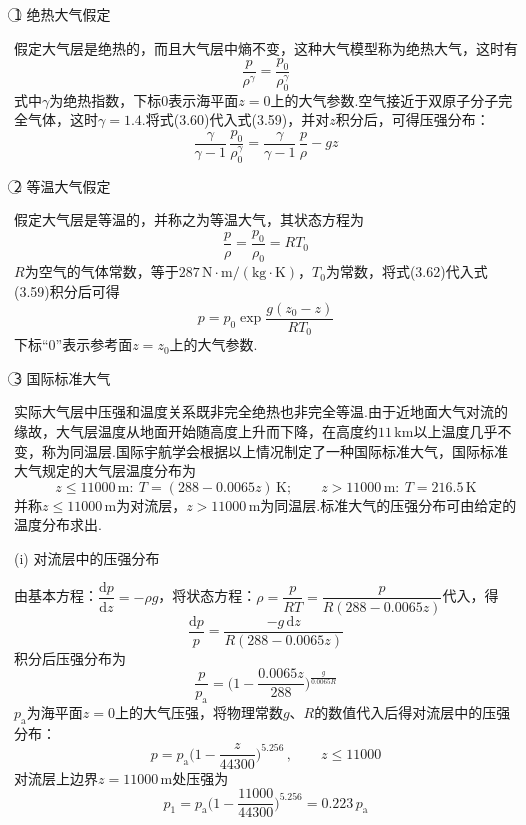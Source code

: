 \textcircled{1} 绝热大气假定

假定大气层是绝热的，而且大气层中熵不变，这种大气模型称为绝热大气，这时有
\begin{equation*}
\frac{p}{\rho^{\gamma}}=\frac{p_0}{\rho_0^{\gamma}}
\tag{3.60}
\end{equation*}
式中$\gamma$为绝热指数，下标0表示海平面$z=0$上的大气参数.空气接近于双原子分子完全气体，这时$\gamma=1.4$.将式(3.60)代入式(3.59)，并对$z$积分后，可得压强分布：
\begin{equation*}
\frac{\gamma}{\gamma-1}\,\frac{p_0}{\rho_0^{\gamma}}=\frac{\gamma}{\gamma-1}\,\frac{p}{\rho}-gz
\tag{3.61}
\end{equation*}

\textcircled{2} 等温大气假定

假定大气层是等温的，并称之为等温大气，其状态方程为
\begin{equation*}
\frac{p}{\rho}=\frac{p_0}{\rho_0}=RT_0
\tag{3.62}
\end{equation*}
$R$为空气的气体常数，等于$287\,\mathrm{N\cdot m/(kg\cdot K)}$，$T_0$为常数，将式(3.62)代入式(3.59)积分后可得
\begin{equation*}
p=p_0\exp\frac{g(z_0-z)}{RT_0}
\tag{3.63}
\end{equation*}
下标“0”表示参考面$z=z_0$上的大气参数.

\textcircled{3} 国际标准大气

实际大气层中压强和温度关系既非完全绝热也非完全等温.由于近地面大气对流的缘故，大气层温度从地面开始随高度上升而下降，在高度约$11\,$km以上温度几乎不变，称为同温层.国际宇航学会根据以上情况制定了一种国际标准大气，国际标准大气规定的大气层温度分布为
\begin{equation*}
z\leqslant 11000\,\mathrm{m}:\ T=(288-0.0065z)\,\mathrm{K};\qquad z>11000\,\mathrm{m}:\ T=216.5\,\mathrm{K}
\tag{3.64}
\end{equation*}
并称$z\leqslant 11000\,$m为对流层，$z>11000\,$m为同温层.标准大气的压强分布可由给定的温度分布求出.

(i) 对流层中的压强分布

由基本方程：$\dfrac{\mathrm{d}p}{\mathrm{d}z}=-\rho g$，将状态方程：$\rho=\dfrac{p}{RT}=\dfrac{p}{R(288-0.0065z)}$代入，得
\[
\frac{\mathrm{d}p}{p}=\frac{-g\,\mathrm{d}z}{R(288-0.0065z)}
\]
积分后压强分布为
\[
\frac{p}{p_{\mathrm{a}}}=\Big(1-\frac{0.0065z}{288}\Big)^{\frac{g}{0.0065R}}
\]
$p_{\mathrm{a}}$为海平面$z=0$上的大气压强，将物理常数$g$、$R$的数值代入后得对流层中的压强分布：
\begin{equation*}
p=p_{\mathrm{a}}\Big(1-\frac{z}{44300}\Big)^{5.256}\,,\qquad z\leqslant 11000
\tag{3.65}
\end{equation*}
对流层上边界$z=11000\,$m处压强为
\begin{equation*}
p_1=p_{\mathrm{a}}\Big(1-\frac{11000}{44300}\Big)^{5.256}=0.223\,p_{\mathrm{a}}
\tag{3.66}
\end{equation*}

